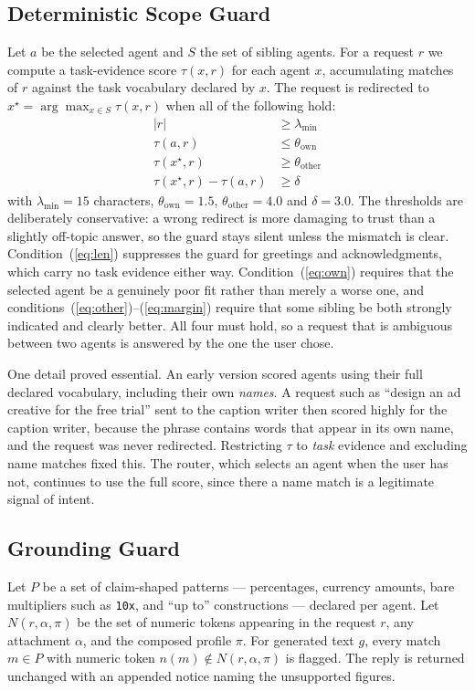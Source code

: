 \documentclass[journal]{IEEEtran}
\begin{document}
\subsection{Deterministic Scope Guard}
Let $a$ be the selected agent and $S$ the set of sibling agents. For a request
$r$ we compute a task-evidence score $\tau(x, r)$ for each agent $x$,
accumulating matches of $r$ against the task vocabulary declared by $x$. The
request is redirected to $x^\star = \arg\max_{x \in S} \tau(x, r)$ when all of
the following hold:
\begin{align}
|r| &\ge \lambda_{\min} \label{eq:len}\\
\tau(a, r) &\le \theta_{\text{own}} \label{eq:own}\\
\tau(x^\star, r) &\ge \theta_{\text{other}} \label{eq:other}\\
\tau(x^\star, r) - \tau(a, r) &\ge \delta \label{eq:margin}
\end{align}
with $\lambda_{\min}=15$ characters, $\theta_{\text{own}}=1.5$,
$\theta_{\text{other}}=4.0$ and $\delta=3.0$. The thresholds are deliberately
conservative: a wrong redirect is more damaging to trust than a slightly
off-topic answer, so the guard stays silent unless the mismatch is clear.
Condition~(\ref{eq:len}) suppresses the guard for greetings and
acknowledgments, which carry no task evidence either way.
Condition~(\ref{eq:own}) requires that the selected agent be a genuinely poor
fit rather than merely a worse one, and
conditions~(\ref{eq:other})--(\ref{eq:margin}) require that some sibling be
both strongly indicated and clearly better. All four must hold, so a request
that is ambiguous between two agents is answered by the one the user chose.

One detail proved essential. An early version scored agents using their full
declared vocabulary, including their own \emph{names}. A request such as
``design an ad creative for the free trial'' sent to the caption writer then
scored highly for the caption writer, because the phrase contains words that
appear in its own name, and the request was never redirected. Restricting
$\tau$ to \emph{task} evidence and excluding name matches fixed this. The
router, which selects an agent when the user has not, continues to use the full
score, since there a name match is a legitimate signal of intent.

\subsection{Grounding Guard}
Let $P$ be a set of claim-shaped patterns --- percentages, currency amounts,
bare multipliers such as \texttt{10x}, and ``up to'' constructions --- declared
per agent. Let $N(r, \alpha, \pi)$ be the set of numeric tokens appearing in
the request $r$, any attachment $\alpha$, and the composed profile $\pi$. For
generated text $g$, every match $m \in P$ with numeric token $n(m) \notin
N(r,\alpha,\pi)$ is flagged. The reply is returned unchanged with an appended
notice naming the unsupported figures.
\end{document}
